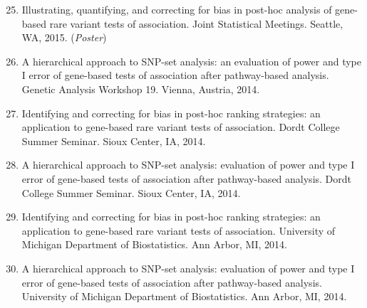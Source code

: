 \documentclass[margin]{res}
\newenvironment{benumerate}[1]{
    \let\oldItem\item
    \def\item{\addtocounter{enumi}{-2}\oldItem}
    
    \begin{enumerate}
    \setcounter{enumi}{#1}
    \addtocounter{enumi}{1}
}{
    \end{enumerate}
}
\begin{document}
\begin{resume}
\begin{benumerate}{24}

\item %
Illustrating, quantifying, and correcting for bias in post-hoc analysis of gene-based rare variant tests of association. Joint Statistical Meetings. Seattle, WA, 2015. (\textit{Poster})


\item %
A hierarchical approach to SNP-set analysis: an evaluation of power and type I error of gene-based tests of association after pathway-based analysis. Genetic Analysis Workshop 19. Vienna, Austria, 2014.

\item %
Identifying and correcting for bias in post-hoc ranking strategies: an application to gene-based rare variant tests of association. Dordt College Summer Seminar. Sioux Center, IA, 2014.

\item %
A hierarchical approach to SNP-set analysis: evaluation of power and type I error of gene-based tests of association after pathway-based analysis. Dordt College Summer Seminar. Sioux Center, IA, 2014.

\item %
Identifying and correcting for bias in post-hoc ranking strategies: an application to gene-based rare variant tests of association. University of Michigan Department of Biostatistics. Ann Arbor, MI, 2014.

\item %
A hierarchical approach to SNP-set analysis: evaluation of power and type I error of gene-based tests of association after pathway-based analysis. University of Michigan Department of Biostatistics. Ann Arbor, MI, 2014.



\end{benumerate}
\end{resume}
\end{document}
